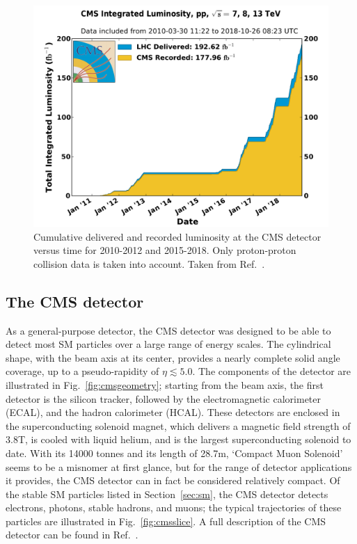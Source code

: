 \begin{figure}[hbtp]
  \begin{center}
    \includegraphics[width=0.7\linewidth]{img/detector/cmslumi.pdf}
    \caption{
        Cumulative delivered and recorded luminosity at the CMS detector versus time for 2010-2012 and 2015-2018.
        Only proton-proton collision data is taken into account.
        Taken from Ref.~\cite{cmslumi}.
        }
    \label{fig:cmslumi}
  \end{center}
\end{figure}


\subsection{The CMS detector}
\label{sec:cmsdetector}

As a general-purpose detector, the CMS detector was designed to be able to detect most SM particles over a large range of energy scales.
% 
The cylindrical shape, with the beam axis at its center, provides a nearly complete solid angle coverage, up to a pseudo-rapidity of $\eta \lesssim 5.0$.
% 
The components of the detector are illustrated in Fig.~\ref{fig:cmsgeometry}; starting from the beam axis, the first detector is the silicon tracker, followed by the electromagnetic calorimeter (ECAL), and the hadron calorimeter (HCAL).
% 
These detectors are enclosed in the superconducting solenoid magnet, which delivers a magnetic field strength of 3.8\unit{T}, is cooled with liquid helium, and is the largest superconducting solenoid to date.
% 
With its 14000 tonnes and its length of 28.7\unit{m}, `Compact Muon Solenoid' seems to be a misnomer at first glance, but for the range of detector applications it provides, the CMS detector can in fact be considered relatively compact.
% 
Of the stable SM particles listed in Section~\ref{sec:sm}, the CMS detector detects electrons, photons, stable hadrons, and muons; the typical trajectories of these particles are illustrated in Fig.~\ref{fig:cmsslice}.
% 
A full description of the CMS detector can be found in Ref.~\cite{Chatrchyan:2008zzk}.


